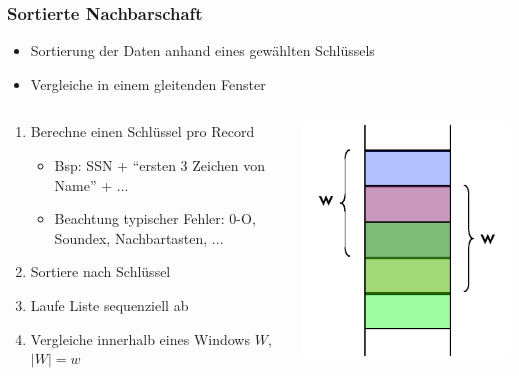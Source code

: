     
    \begin{frame}
    \frametitle{Sortierte Nachbarschaft}
    
    \begin{itemize}
    \item Sortierung der Daten anhand eines gewählten Schlüssels
    \item Vergleiche in einem gleitenden Fenster
    \end{itemize}
    
    \begin{columns}[c]
    \begin{column}{7.5cm}
    \begin{enumerate}
    \item Berechne einen Schlüssel pro Record
    \begin{itemize}
    \item Bsp: SSN + "`ersten 3 Zeichen von Name"' + ...
    \item Beachtung typischer Fehler: 0-O, Soundex, Nachbartasten, ...
    \end{itemize}
    \item Sortiere nach Schlüssel
    \item Laufe Liste sequenziell ab
    \item Vergleiche innerhalb eines Windows $W$, $|W|=w$
    \end{enumerate}
    \end{column}
    \begin{column}{3.5cm}
    \includegraphics[scale=.6]{fig4/sorted-neighborhood.pdf}
    \end{column}
    \end{columns}
    
    
    \end{frame}
    
